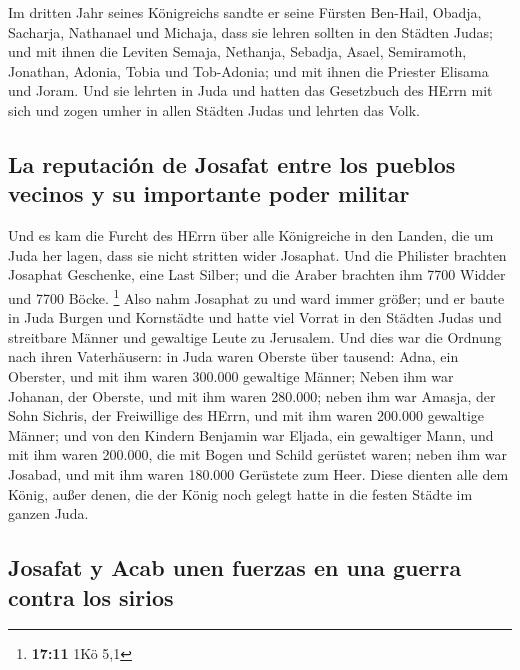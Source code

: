  Im dritten Jahr seines Königreichs sandte er seine
Fürsten Ben-Hail, Obadja, Sacharja, Nathanael und Michaja, dass sie
lehren sollten in den Städten Judas;  und mit ihnen die
Leviten Semaja, Nethanja, Sebadja, Asael, Semiramoth, Jonathan, Adonia,
Tobia und Tob-Adonia; und mit ihnen die Priester Elisama und Joram.
 Und sie lehrten in Juda und hatten das Gesetzbuch des
HErrn mit sich und zogen umher in allen Städten Judas und lehrten das
Volk.

\hypertarget{la-reputaciuxf3n-de-josafat-entre-los-pueblos-vecinos-y-su-importante-poder-militar}{%
\subsection{La reputación de Josafat entre los pueblos vecinos y su
importante poder
militar}\label{la-reputaciuxf3n-de-josafat-entre-los-pueblos-vecinos-y-su-importante-poder-militar}}

 Und es kam die Furcht des HErrn über alle Königreiche in
den Landen, die um Juda her lagen, dass sie nicht stritten wider
Josaphat.  Und die Philister brachten Josaphat Geschenke,
eine Last Silber; und die Araber brachten ihm 7700 Widder und 7700
Böcke. \footnote{\textbf{17:11} 1Kö 5,1}  Also nahm
Josaphat zu und ward immer größer; und er baute in Juda Burgen und
Kornstädte  und hatte viel Vorrat in den Städten Judas
und streitbare Männer und gewaltige Leute zu Jerusalem. 
Und dies war die Ordnung nach ihren Vaterhäusern: in Juda waren Oberste
über tausend: Adna, ein Oberster, und mit ihm waren 300.000 gewaltige
Männer;  Neben ihm war Johanan, der Oberste, und mit ihm
waren 280.000;  neben ihm war Amasja, der Sohn Sichris,
der Freiwillige des HErrn, und mit ihm waren 200.000 gewaltige Männer;
 und von den Kindern Benjamin war Eljada, ein gewaltiger
Mann, und mit ihm waren 200.000, die mit Bogen und Schild gerüstet
waren;  neben ihm war Josabad, und mit ihm waren 180.000
Gerüstete zum Heer.  Diese dienten alle dem König, außer
denen, die der König noch gelegt hatte in die festen Städte im ganzen
Juda.

\hypertarget{josafat-y-acab-unen-fuerzas-en-una-guerra-contra-los-sirios}{%
\subsection{Josafat y Acab unen fuerzas en una guerra contra los
sirios}\label{josafat-y-acab-unen-fuerzas-en-una-guerra-contra-los-sirios}}

